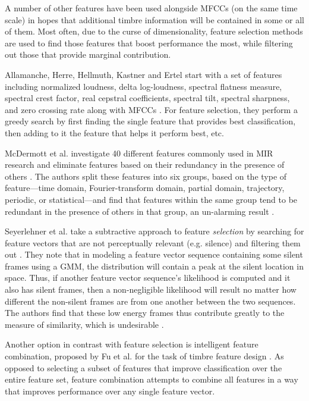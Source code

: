 \documentclass[12pt]{report} 	%
\numberwithin{figure}{chapter}
\numberwithin{table}{chapter}
\numberwithin{equation}{chapter}
\begin{document}
\begin{flushleft}
A number of other features have been used alongside MFCCs (on the same time scale) in hopes that additional timbre information will be contained in some or all of them. Most often, due to the curse of dimensionality, feature selection methods are used to find those features that boost performance the most, while filtering out those that provide marginal contribution. 

Allamanche, Herre, Hellmuth, Kastner and Ertel start with a set of features including normalized loudness, delta log-loudness, spectral flatness measure, spectral crest factor, real cepstral coefficients, spectral tilt, spectral sharpness, and zero crossing rate along with MFCCs \cite{Allamanche:2002yo}. For feature selection, they perform a greedy search by first finding the single feature that provides best classification, then adding to it the feature that helps it perform best, etc.

McDermott et al. investigate 40 different features commonly used in MIR research and eliminate features based on their redundancy in the presence of others \cite[p. 1]{McDermott:2005xq}. The authors split these features into six groups, based on the type of feature---time domain, Fourier-transform domain, partial domain, trajectory, periodic, or statistical---and find that features within the same group tend to be redundant in the presence of others in that group, an un-alarming result \cite[p. 6]{McDermott:2005xq}.

Seyerlehner et al. take a subtractive approach to feature \textit{selection} by searching for feature vectors that are not perceptually relevant (e.g. silence) and filtering them out \cite{Seyerlehner:2009hs}. They note that in modeling a feature vector sequence containing some silent frames using a GMM, the distribution will contain a peak at the silent location in space. Thus, if another feature vector sequence's likelihood is computed and it also has silent frames, then a non-negligible likelihood will result no matter how different the non-silent frames are from one another between the two sequences. The authors find that these low energy frames thus contribute greatly to the measure of similarity, which is undesirable \cite[p. 3]{Seyerlehner:2009hs}.

Another option in contrast with feature selection is intelligent feature combination, proposed by Fu et al. for the task of timbre feature design \cite{Fu:2009mz}. As opposed to selecting a subset of features that improve classification over the entire feature set, feature combination attempts to combine all features in a way that improves performance over any single feature vector.


\end{flushleft}
\end{document}
